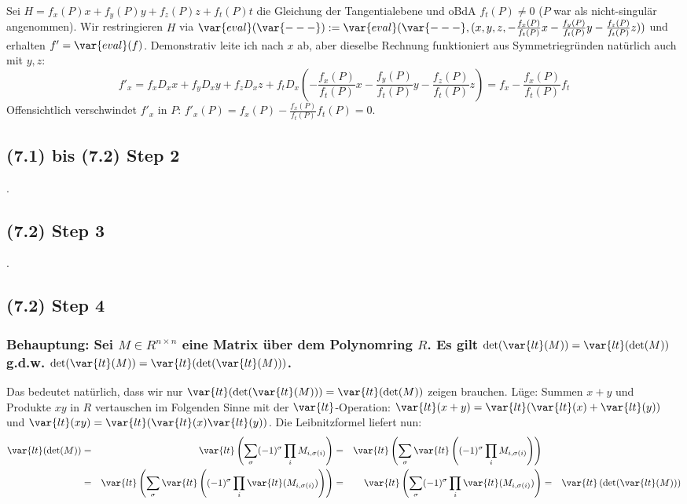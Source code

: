 Sei $H = f_x(P)x + f_y(P)y + f_z(P)z + f_t(P)t$ die Gleichung der Tangentialebene und oBdA $f_t(P) \neq 0$ ($P$ war als nicht-singulär angenommen).
Wir restringieren $H$ via $\var{eval}(\var{---}) := \var{eval}(\var{---},(x,y,z,-\frac{f_x(P)}{f_t(P)}x-\frac{f_y(P)}{f_t(P)}y-\frac{f_z(P)}{f_t(P)}z))$ und erhalten
$f' = \var{eval}(f)$. Demonstrativ leite ich nach $x$ ab, aber dieselbe Rechnung funktioniert aus Symmetriegründen natürlich auch mit $y,z$:
\begin{equation}
f'_x = f_x D_xx + f_y D_x y + f_z D_x z + f_t D_x (-\frac{f_x(P)}{f_t(P)}x-\frac{f_y(P)}{f_t(P)}y-\frac{f_z(P)}{f_t(P)}z) = f_x - \frac{f_x(P)}{f_t(P)} f_t
\end{equation}
Offensichtlich verschwindet $f'_x$ in $P$: $f'_x(P) = f_x(P) - \frac{f_x(P)}{f_t(P)} f_t(P) = 0$.
\subsection{(7.1) bis (7.2) Step 2} .
\subsection{(7.2) Step 3} .
\subsection{(7.2) Step 4}

\subsubsection{ %
Behauptung: Sei $M \in R^{n\times n}$ eine Matrix über dem Polynomring $R$.
Es gilt $\det(\var{lt}(M)) = \var{lt}(\det(M))$ g.d.w. $\det(\var{lt}(M)) = \var{lt}(\det(\var{lt}(M)))$.
} %

Das bedeutet natürlich, dass wir nur $\var{lt}(\det(\var{lt}(M))) = \var{lt}(\det(M))$ zeigen brauchen.
Lüge: Summen $x+y$ und Produkte $xy$ in $R$ vertauschen im Folgenden Sinne mit der $\var{lt}$-Operation: $\var{lt}(x+y) = \var{lt}(\var{lt}(x) + \var{lt}(y))$ und $\var{lt}(xy) = \var{lt}(\var{lt}(x)\var{lt}(y))$.
Die Leibnitzformel liefert nun:
\begin{align*}
  \var{lt}(\det(M))
&= &\var{lt}\left(\sum_\sigma (-1)^\sigma \prod_i M_{i,\sigma(i)}\right)
&= &\var{lt}\left(\sum_\sigma \var{lt}\left((-1)^\sigma \prod_i M_{i,\sigma(i)}\right)\right)
& &
\\
&= &\var{lt}\left(\sum_\sigma \var{lt}\left((-1)^\sigma \prod_i \var{lt}(M_{i,\sigma(i)})\right)\right)
&= &\var{lt}\left(\sum_\sigma (-1)^\sigma \prod_i \var{lt}(M_{i,\sigma(i)})\right)
&= &\var{lt}\left(\det(\var{lt}(M))\right)
\end{align*}


